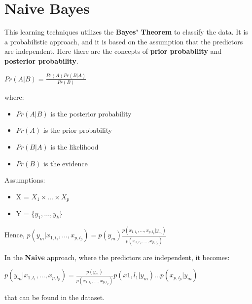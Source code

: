 \section{Naive Bayes}

This learning techniques utilizes the \textbf{Bayes' Theorem} to classify the data. It is a probabilistic approach, and it is based on the assumption that the predictors are independent. Here there are the concepts of \textbf{prior probability} and \textbf{posterior probability}.

\begin{center}
    $Pr(A|B) = \frac{Pr(A)Pr(B|A)}{Pr(B)}$
\end{center}

where:
\begin{itemize}
    \item $Pr(A|B)$ is the posterior probability
    \item $Pr(A)$ is the prior probability
    \item $Pr(B|A)$ is the likelihood
    \item $Pr(B)$ is the evidence
\end{itemize}

Assumptions:
\begin{itemize}
    \item X = $X_1 \times \dots \times X_p$
    \item Y = \{$y_1, \dots, y_k$\}
\end{itemize}


Hence, $p(y_m | x_{1,l_1},\dots,x_{p,l_p}) = p(y_m)\frac{p(x_{1,l_1},\dots,x_{p,l_p} | y_m)}{p(x_{1,l_1},\dots,x_{p,l_p})}$

In the \textbf{Naive} approach, where the predictors are independent, it becomes:

$p(y_m | x_{1,l_1},\dots,x_{p,l_p}) = \frac{p(y_m)}{p(x_{1,l_1},\dots,x_{p,l_p})}p(x{1,l_1} | y_m) \dots p(x_{p,l_p} | y_m)$

that can be found in the dataset.

